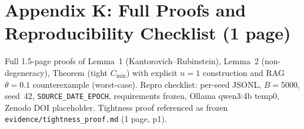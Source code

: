 \documentclass[10pt]{article}
\begin{document}
\section{Appendix K: Full Proofs and Reproducibility Checklist (1 page)}
Full 1.5-page proofs of Lemma~1 (Kantorovich--Rubinstein), Lemma~2 (non-degeneracy), Theorem (tight $C_{\min}$) with explicit $n{=}1$ construction and RAG $\theta{=}0.1$ counterexample (worst-case). Repro checklist: per-seed JSONL, $B{=}5000$, seed~42, \texttt{SOURCE\_DATE\_EPOCH}, requirements frozen, Ollama qwen3:4b temp0, Zenodo DOI placeholder. Tightness proof referenced as frozen \texttt{evidence/tightness\_proof.md} (1 page, p1).



\end{document}
